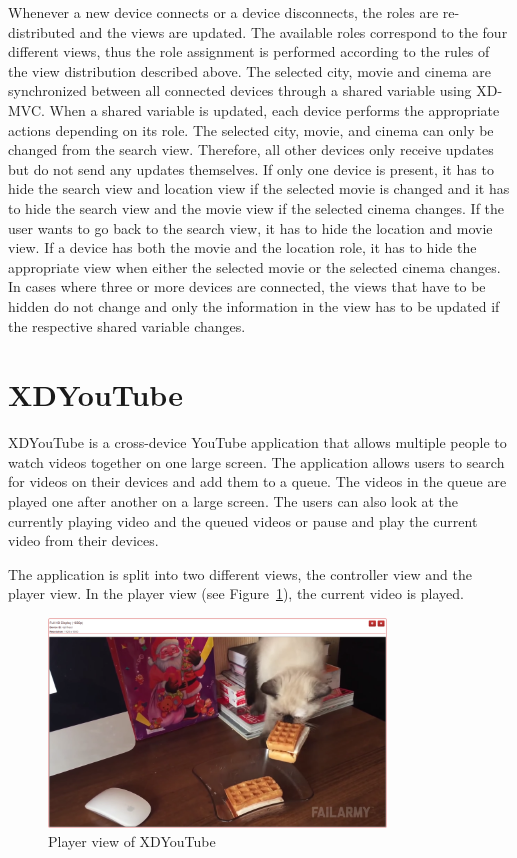 Whenever a new device connects or a device disconnects, the roles are re-distributed and the views are updated. The available roles correspond to the four different views, thus the role assignment is performed according to the rules of the view distribution described above. The selected city, movie and cinema are synchronized between all connected devices through a shared variable using XD-MVC. When a shared variable is updated, each device performs the appropriate actions depending on its role. The selected city, movie, and cinema can only be changed from the search view. Therefore, all other devices only receive updates but do not send any updates themselves. If only one device is present, it has to hide the search view and location view if the selected movie is changed and it has to hide the search view and the movie view if the selected cinema changes. If the user wants to go back to the search view, it has to hide the location and movie view. If a device has both the movie and the location role, it has to hide the appropriate view when either the selected movie or the selected cinema changes. In cases where three or more devices are connected, the views that have to be hidden do not change and only the information in the view has to be updated if the respective shared variable changes. 

\section{XDYouTube}

XDYouTube is a cross-device YouTube application that allows multiple people to watch videos together on one large screen. The application allows users to search for videos on their devices and add them to a queue. The videos in the queue are played one after another on a large screen. The users can also look at the currently playing video and the queued videos or pause and play the current video from their devices. 

The application is split into two different views, the controller view and the player view. In the player view (see Figure~\ref{fig:xdyt_player}), the current video is played. 

\begin{figure}[H]
  \centering
    \includegraphics[width=0.8\textwidth]{images/screenshots/xdyt/player_2.png}
	\caption[Screenshot XDYouTube: Player view]{Player view of XDYouTube}
	\label{fig:xdyt_player}
\end{figure}

